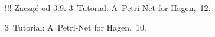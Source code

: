 \documentclass[a4paper,11pt]{article}
\begin{document}
\begin{figure}

  \centering


  \begin{tikzpicture}


  \end{tikzpicture}

  \caption{!!! Zacząć od 3.9. 3~Tutorial: A~Petri-Net for Hagen,~12.}


\end{figure}





\begin{figure}

  \centering


  \begin{tikzpicture}


  \end{tikzpicture}

  \caption{3~Tutorial: A~Petri-Net for Hagen,~10.}


\end{figure}
































\end{document}
